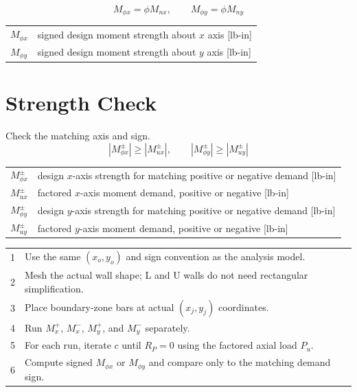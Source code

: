 \documentclass[10pt]{article}
\begin{document}
\begin{equation}
M_{\phi x} = \phi M_{nx}, \qquad M_{\phi y} = \phi M_{ny}
\end{equation}

{\ttfamily\footnotesize
\begin{tabular}{@{}ll@{}}
$M_{\phi x}$ & signed design moment strength about $x$ axis [lb-in] \\
$M_{\phi y}$ & signed design moment strength about $y$ axis [lb-in] \\
\end{tabular}
}

\section{Strength Check}

Check the matching axis and sign.
\begin{equation}
|M_{\phi x}^{\pm}| \geq |M_{ux}^{\pm}|, \qquad
|M_{\phi y}^{\pm}| \geq |M_{uy}^{\pm}|
\end{equation}

{\ttfamily\footnotesize
\begin{tabular}{@{}ll@{}}
$M_{\phi x}^{\pm}$ & design $x$-axis strength for matching positive or negative demand [lb-in] \\
$M_{ux}^{\pm}$ & factored $x$-axis moment demand, positive or negative [lb-in] \\
$M_{\phi y}^{\pm}$ & design $y$-axis strength for matching positive or negative demand [lb-in] \\
$M_{uy}^{\pm}$ & factored $y$-axis moment demand, positive or negative [lb-in] \\
\end{tabular}
}


{\ttfamily\footnotesize
\begin{tabular}{@{}p{0.35in}p{6.35in}@{}}
1 & Use the same $(x_o,y_o)$ and sign convention as the analysis model. \\
2 & Mesh the actual wall shape; L and U walls do not need rectangular simplification. \\
3 & Place boundary-zone bars at actual $(x_j,y_j)$ coordinates. \\
4 & Run $M_x^+$, $M_x^-$, $M_y^+$, and $M_y^-$ separately. \\
5 & For each run, iterate $c$ until $R_P=0$ using the factored axial load $P_u$. \\
6 & Compute signed $M_{\phi x}$ or $M_{\phi y}$ and compare only to the matching demand sign. \\
\end{tabular}
}
\end{document}
